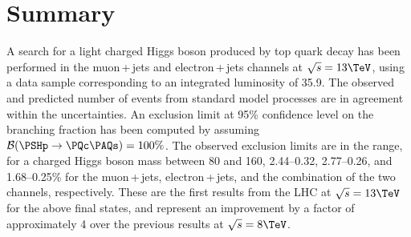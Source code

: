\section{Summary}
\label{s:secConcl}
A search for a light charged Higgs boson produced by top quark
decay has been performed in the muon\,+\,jets and electron\,+\,jets
channels at $\sqrt{s} = 13\TeV$, using a data sample corresponding to
an integrated luminosity of 35.9\fbinv. The observed and predicted
number of events from standard model processes are in agreement within 
the uncertainties. An exclusion limit at 95\% confidence level on the 
branching fraction \Bthb has
been computed by assuming $\BHcs = 100\%$.
The observed exclusion limits are in the range, for a charged Higgs
boson mass between 80 and 160\GeV, 2.44--0.32, 2.77--0.26, and
1.68--0.25\% for the muon\,+\,jets, electron\,+\,jets, and the 
combination of the two channels, respectively. These are the first 
results from the LHC at $\sqrt{s}=13\TeV$ for the above final states,
and represent an improvement by a factor of approximately 4 over
the previous results at $\sqrt{s}=8\TeV$.

